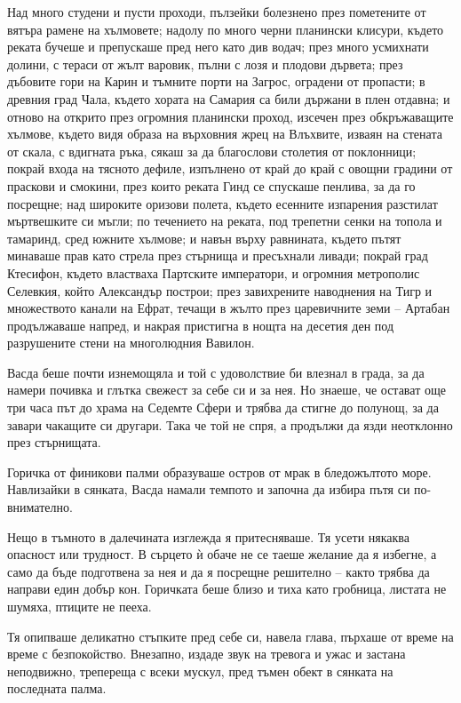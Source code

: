 Над много студени и пусти проходи, пълзейки болезнено през пометените от вятъра
рамене на хълмовете; надолу по много черни планински клисури, където реката
бучеше и препускаше пред него като див водач; през много усмихнати долини, с
тераси от жълт варовик, пълни с лозя и плодови дървета; през дъбовите гори на
Карин и тъмните порти на Загрос, оградени от пропасти; в древния град Чала,
където хората на Самария са били държани в плен отдавна; и отново на открито
през огромния планински проход, изсечен през обкръжаващите хълмове, където видя
образа на върховния жрец на Влъхвите, изваян на стената от скала, с вдигната
ръка, сякаш за да благослови столетия от поклонници; покрай входа на тясното
дефиле, изпълнено от край до край с овощни градини от праскови и смокини, през
които реката Гинд се спускаше пенлива, за да го посрещне; над широките оризови
полета, където есенните изпарения разстилат мъртвешките си мъгли; по течението
на реката, под трепетни сенки на топола и тамаринд, сред южните хълмове; и навън
върху равнината, където пътят минаваше прав като стрела през стърнища и
пресъхнали ливади; покрай град Ктесифон, където властваха Партските императори,
и огромния метрополис Селевкия, който Александър построи; през завихрените
наводнения на Тигр и множеството канали на Ефрат, течащи в жълто през
царевичните земи -- Артабан продължаваше напред, и накрая пристигна в нощта на
десетия ден под разрушените стени на многолюдния Вавилон.

Васда беше почти изнемощяла и той с удоволствие би влезнал в града, за да намери
почивка и глътка свежест за себе си и за нея. Но знаеше, че остават още три часа
път до храма на Седемте Сфери и трябва да стигне до полунощ, за да завари
чакащите си другари. Така че той не спря, а продължи да язди неотклонно през
стърнищата.

Горичка от финикови палми образуваше остров от мрак в бледожълтото море.
Навлизайки в сянката, Васда намали темпото и започна да избира пътя си
по-внимателно.

Нещо в тъмното в далечината изглежда я притесняваше. Тя усети някаква опасност
или трудност. В сърцето ѝ обаче не се таеше желание да я избегне, а само да бъде
подготвена за нея и да я посрещне решително -- както трябва да направи един
добър кон. Горичката беше близо и тиха като гробница, листата не шумяха, птиците
не пееха.

Тя опипваше деликатно стъпките пред себе си, навела глава, пърхаше от време на
време с безпокойство. Внезапно, издаде звук на тревога и ужас и застана
неподвижно, трепереща с всеки мускул, пред тъмен обект в сянката на последната
палма.

